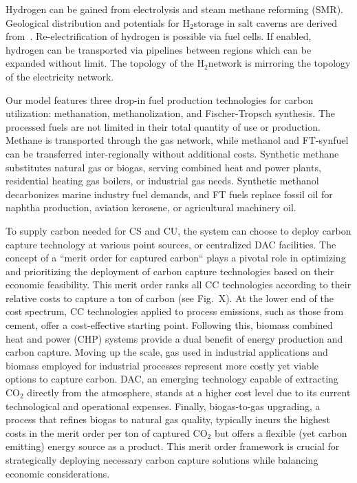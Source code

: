 \documentclass[twocolumn]{article}
\newcommand{\carbon}{CO$_2$}
\newcommand{\hydrogen}{H$_2$}
\begin{document}
Hydrogen can be gained from electrolysis and steam methane reforming (SMR). Geological distribution and potentials for \hydrogen storage in salt caverns are derived from~\cite{caglayanTechnicalPotentialSalt2020}. Re-electrification of hydrogen is possible via fuel cells. If enabled, hydrogen can be transported via pipelines between regions which can be expanded without limit. The topology of the \hydrogen network is mirroring the topology of the electricity network.

Our model features three drop-in fuel production technologies for carbon utilization: methanation, methanolization, and Fischer-Tropsch synthesis. The processed fuels are not limited in their total quantity of use or production. Methane is transported through the gas network, while methanol and FT-synfuel can be transferred inter-regionally without additional costs. Synthetic methane substitutes natural gas or biogas, serving combined heat and power plants, residential heating gas boilers, or industrial gas needs. Synthetic methanol decarbonizes marine industry fuel demands, and FT fuels replace fossil oil for naphtha production, aviation kerosene, or agricultural machinery oil.

To supply carbon needed for CS and CU, the system can choose to deploy carbon capture technology at various point sources, or centralized DAC facilities. The concept of a ``merit order for captured carbon`` plays a pivotal role in optimizing and prioritizing the deployment of carbon capture technologies based on their economic feasibility. This merit order ranks all CC technologies according to their relative costs to capture a ton of carbon (see Fig.~X). At the lower end of the cost spectrum, CC technologies applied to process emissions, such as those from cement, offer a cost-effective starting point. Following this, biomass combined heat and power (CHP) systems provide a dual benefit of energy production and carbon capture. Moving up the scale, gas used in industrial applications and biomass employed for industrial processes represent more costly yet viable options to capture carbon. DAC, an emerging technology capable of extracting \carbon{} directly from the atmosphere, stands at a higher cost level due to its current technological and operational expenses. Finally, biogas-to-gas upgrading, a process that refines biogas to natural gas quality, typically incurs the highest costs in the merit order per ton of captured \carbon{} but offers a flexible (yet carbon emitting) energy source as a product. This merit order framework is crucial for strategically deploying necessary carbon capture solutions while balancing economic considerations.
\end{document}
